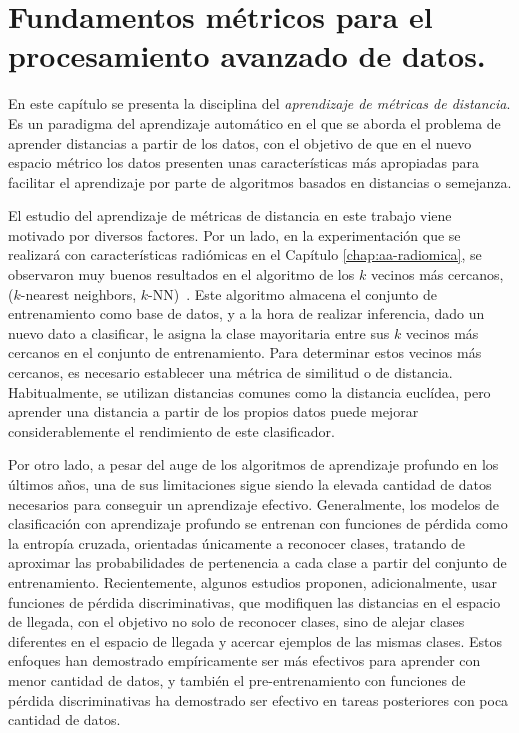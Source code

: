 
\chapter{Fundamentos métricos para el procesamiento avanzado de datos.} \label{chap:metric-learning-mates}

En este capítulo se presenta la disciplina del \emph{aprendizaje de métricas de distancia}. Es un paradigma del aprendizaje automático en el que se aborda el problema de aprender distancias a partir de los datos, con el objetivo de que en el nuevo espacio métrico los datos presenten unas características más apropiadas para facilitar el aprendizaje por parte de algoritmos basados en distancias o semejanza.

El estudio del aprendizaje de métricas de distancia en este trabajo viene motivado por diversos factores. Por un lado, en la experimentación que se realizará con características radiómicas en el Capítulo \ref{chap:aa-radiomica}, se observaron muy buenos resultados en el algoritmo de los $k$ vecinos más cercanos, ($k$-nearest neighbors, $k$-NN)~\parencite{cover1967nearest}. Este algoritmo almacena el conjunto de entrenamiento como base de datos, y a la hora de realizar inferencia, dado un nuevo dato a clasificar, le asigna la clase mayoritaria entre sus $k$ vecinos más cercanos en el conjunto de entrenamiento. Para determinar estos vecinos más cercanos, es necesario establecer una métrica de similitud o de distancia. Habitualmente, se utilizan distancias comunes como la distancia euclídea, pero aprender una distancia a partir de los propios datos puede mejorar considerablemente el rendimiento de este clasificador.

Por otro lado, a pesar del auge de los algoritmos de aprendizaje profundo en los últimos años, una de sus limitaciones sigue siendo la elevada cantidad de datos necesarios para conseguir un aprendizaje efectivo. Generalmente, los modelos de clasificación con aprendizaje profundo se entrenan con funciones de pérdida como la entropía cruzada, orientadas únicamente a reconocer clases, tratando de aproximar las probabilidades de pertenencia a cada clase a partir del conjunto de entrenamiento. Recientemente, algunos estudios proponen, adicionalmente, usar funciones de pérdida discriminativas, que modifiquen las distancias en el espacio de llegada, con el objetivo no solo de reconocer clases, sino de alejar clases diferentes en el espacio de llegada y acercar ejemplos de las mismas clases. Estos enfoques han demostrado empíricamente ser más efectivos para aprender con menor cantidad de datos, y también el pre-entrenamiento con funciones de pérdida discriminativas ha demostrado ser efectivo en tareas posteriores con poca cantidad de datos.

